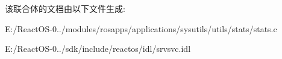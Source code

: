 该联合体的文档由以下文件生成\+:\begin{DoxyCompactItemize}
\item 
E\+:/\+React\+O\+S-\/0../modules/rosapps/applications/sysutils/utils/stats/stats.\+c\item 
E\+:/\+React\+O\+S-\/0../sdk/include/reactos/idl/srvsvc.\+idl\end{DoxyCompactItemize}
